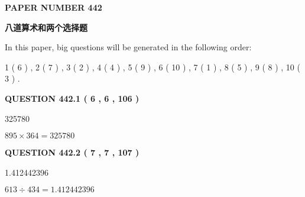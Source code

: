 \documentclass{ctexart}
\begin{document}
   
   
   
 {\textbf{ \Large{ PAPER NUMBER  442  }}}
   
   
\vspace{0.2in}
   
   
   
   
   
   
 \vspace{0.2in}
{\LARGE {\textbf{ 八道算术和两个选择题}}}
   
   
   
\vspace{0.2in}
   
In this paper, big questions will be generated in the following order: 
   
   
   1 ( 6 )
 ,
   2 ( 7 )
 ,
   3 ( 2 )
 ,
   4 ( 4 )
 ,
   5 ( 9 )
 ,
   6 ( 10 )
 ,
   7 ( 1 )
 ,
   8 ( 5 )
 ,
   9 ( 8 )
 ,
   10 ( 3 )
 .
  
\vspace{0.2in}
  
{\textbf{\Large{QUESTION
442.1 
 ( 6 , 6 , 106 )
}}}
  
  
 
 
\noindent{}

325780
 
 
 
 
\noindent{}

$ %
895 \times  %
364=   %
325780$
 
 
  
\vspace{0.2in}
  
{\textbf{\Large{QUESTION
442.2 
 ( 7 , 7 , 107 )
}}}
  
  
 
 
\noindent{}

1.412442396
 
 
 
 
\noindent{}

$ %
613 \div  %
434=   %
1.412442396$
 
 
  
\vspace{0.2in}
  
\end{document}
